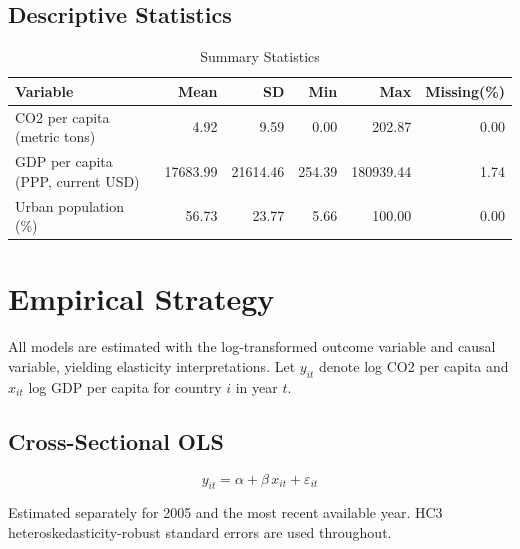 \documentclass[12pt, a4paper]{article}
\begin{document}
\subsection{Descriptive Statistics}

\begin{table}[H]
\centering
\begin{threeparttable}
\caption{Summary Statistics}
\label{tab:sumstats}
\begin{tabularx}{\textwidth}{Xrrrrr}
\toprule
\textbf{Variable} & \textbf{Mean} & \textbf{SD} & \textbf{Min} & \textbf{Max} & \textbf{Missing(\%)}\\
\midrule
CO2 per capita (metric tons)        & 4.92      & 9.59      & 0.00      & 202.87    & 0.00\\[0.3em]
GDP per capita (PPP, current USD)   & 17683.99  & 21614.46  & 254.39    & 180939.44 & 1.74\\[0.3em]
Urban population (\%)               & 56.73     & 23.77     & 5.66      & 100.00    & 0.00\\[0.3em]
\bottomrule
\end{tabularx}
\end{threeparttable}
\end{table}

\section{Empirical Strategy}

All models are estimated with the log-transformed outcome variable and causal variable, yielding elasticity interpretations. Let $y_{it}$ denote log CO2 per capita and $x_{it}$ log GDP per capita for country $i$ in year $t$.

\subsection{Cross-Sectional OLS}

\begin{equation}
y_{it} = \alpha + \beta \, x_{it} + \varepsilon_{it}
\label{eq:cross}
\end{equation}

Estimated separately for 2005 and the most recent available year. HC3 heteroskedasticity-robust standard errors are used throughout.
\end{document}
